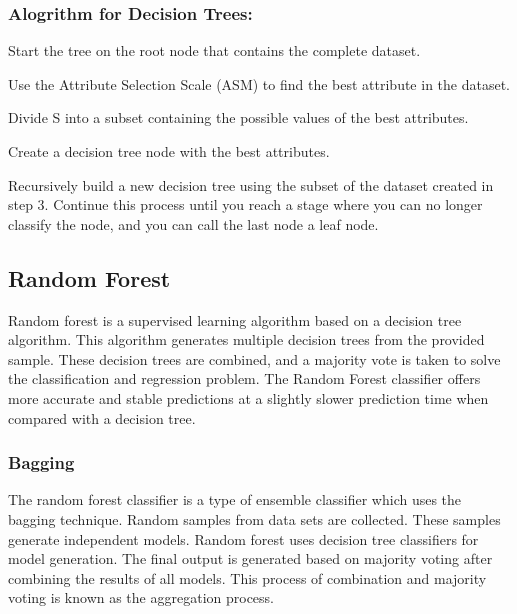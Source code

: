 \subsubsection{Alogrithm for Decision Trees:}
\begin{steps}
    \vspace{-0.5em}
    \setlength{\itemsep}{-0.2em}
    \item Start the tree on the root node that contains the complete dataset.
    \item Use the Attribute Selection Scale (ASM) to find the best attribute in the dataset.
    \item Divide S into a subset containing the possible values of the best attributes.
    \item Create a decision tree node with the best attributes.
    \item Recursively build a new decision tree using the subset of the dataset created in step
    3. Continue this process until you reach a stage where you can no longer classify the node,
    and you can call the last node a leaf node.
    \vspace{-1em}
\end{steps}

\subsection{Random Forest} \label{subsec:random_forest}
Random forest is a supervised learning algorithm based on a decision tree algorithm. This
algorithm generates multiple decision trees from the provided sample. These decision trees are
combined, and a majority vote is taken to solve the classification and regression problem. The
Random Forest classifier offers more accurate and stable predictions at a slightly slower
prediction time when compared with a decision tree.

\subsubsection{Bagging}
\vspace{-0.5em}
The random forest classifier is a type of ensemble classifier which uses the bagging technique.
Random samples from data sets are collected. These samples generate independent models. Random
forest uses decision tree classifiers for model generation. The final output is generated based
on majority voting after combining the results of all models. This process of combination and
majority voting is known as the aggregation process.

